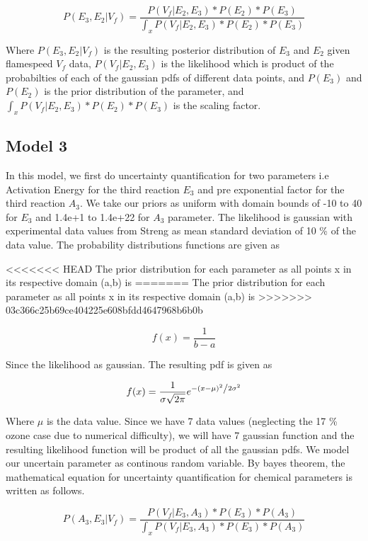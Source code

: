  $$P( E_3, E_2 |V_f ) = \frac{P(V_f| E_2,E_3)* P(E_2)* P(E_3)}{\int_x P(V_f|E_2,E_3)* P(E_2)*P(E_3)}$$ 
 
 \noindent Where  $P(E_3,E_2 |V_f)$ is the resulting posterior distribution of $E_3$ and $E_2$ given flamespeed $V_f$ data, $P(V_f| E_2 ,E_3)$ is the likelihood which is product of the probabilties of each of the gaussian pdfs of different data points, and $ P(E_3)$ and $P(E_2)$ is the prior distribution of the parameter, and $\int_x P(V_f|E_2,E_3)* P(E_2)*P(E_3)$ is the scaling factor.
 

\subsection{Model 3}


\noindent In this model, we first do uncertainty quantification for two parameters i.e Activation Energy for the third reaction $E_3$ and pre exponential factor for the third reaction $A_3$. We take our priors as uniform with domain bounds of -10 to 40 for $E_3$  and 1.4e+1 to 1.4e+22 for $A_3$  parameter. The likelihood is gaussian with experimental data values from Streng\cite{Streng} as mean standard deviation of 10 \% of the data value. The probability distributions functions are given as

<<<<<<< HEAD
\noindent The prior distribution for each parameter as all points x in its respective domain (a,b) is 
=======
\noindent The prior distribution for each parameter as all points x in its respective domain (a,b) is 
>>>>>>> 03c366c25b69ce404225e608bfdd4647968b6b0b

$$f(x) = \frac{1}{b -a}$$


\noindent Since the likelihood as gaussian. The resulting pdf is given as 

$$f(x) = \frac{1}{{\sigma \sqrt {2\pi } }}e^{{{ - \left( {x - \mu } \right)^2 } \mathord{\left/ {\vphantom {{ - \left( {x - \mu } \right)^2 } {2\sigma ^2 }}} \right. \kern-\nulldelimiterspace} {2\sigma ^2 }}} $$

  
\noindent Where $\mu$ is the data value. Since we have 7 data values (neglecting the 17 \% ozone case due to numerical difficulty), we will have 7 gaussian function and the resulting likelihood function will be product of all the gaussian pdfs. We model our uncertain parameter as continous random variable. By bayes theorem, the mathematical equation for uncertainty quantification for chemical parameters is written as follows. 

 $$P( A_3, E_3 |V_f ) = \frac{P(V_f| E_3,A_3)* P(E_3)* P(A_3)}{\int_x P(V_f|E_3,A_3)* P(E_3)*P(A_3)}$$ 
 
